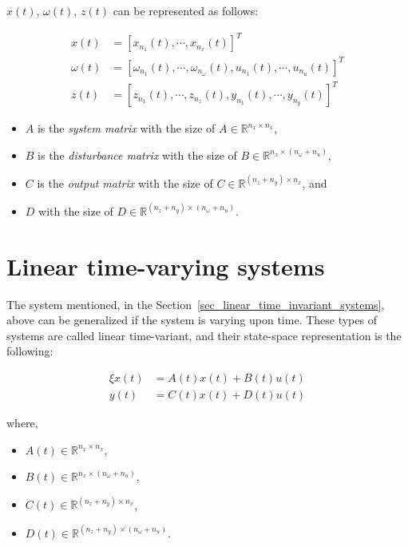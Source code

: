 $x(t)$, $\omega(t)$, $z(t)$ can be represented as follows:

\begin{subequations}
	\begin{align}
		x(t) &=	[x_{n_1}(t), \cdots, x_{n_x}(t)]^T 
		\\
		\omega(t) &= [\omega_{n_1}(t), \cdots, \omega_{{n_\omega}}(t),
		u_{n_1}(t), \cdots, u_{n_u}(t)]^T 
		\\
		z(t) &= [z_{n_1}(t), \cdots, z_{n_z}(t),
		y_{n_1}(t), \cdots, y_{n_y}(t)]^T	 
	\end{align}
\end{subequations}

\begin{itemize}
	\item $A$ is the \textit{system matrix} 
	with the size of $A \in \mathbb{R}^{n_x \times n_x}$,
	\item $B$ is the \textit{disturbance matrix} 
	with the size of $B \in \mathbb{R}^{n_x \times (n_\omega + n_u)}$,
	\item $C$ is the \textit{output matrix} 
	with the size of $C \in \mathbb{R}^{(n_z + n_y) \times n_x}$, and
	\item $D$ 
	with the size of $D \in \mathbb{R}^{(n_z + n_y) \times (n_\omega + n_u)}$.
\end{itemize}
	
\section{Linear time-varying systems} 
\label{sec_linear_time_varying_systems}

The system mentioned, in the Section~\ref{sec_linear_time_invariant_systems}, above can be generalized if the system is varying upon time. These types of systems are called linear time-variant, and their state-space representation is the following:

\begin{subequations} \label{ss_ltv}
	\begin{align}
		\xi x(t) &= A(t)x(t) + B(t)u(t) 
		\\
		y(t) &= C(t)x(t) + D(t)u(t)
	\end{align}
\end{subequations}

where, %
		
\begin{itemize}
	\item $A(t) \in \mathbb{R}^{n_x \times n_x}$, 
	\item $B(t) \in \mathbb{R}^{n_x \times (n_\omega + n_u)}$, 
	\item $C(t) \in \mathbb{R}^{(n_z + n_y) \times n_x}$, 
	\item $D(t) \in \mathbb{R}^{(n_z + n_y) \times (n_\omega + n_u)}$. 
\end{itemize}
	
